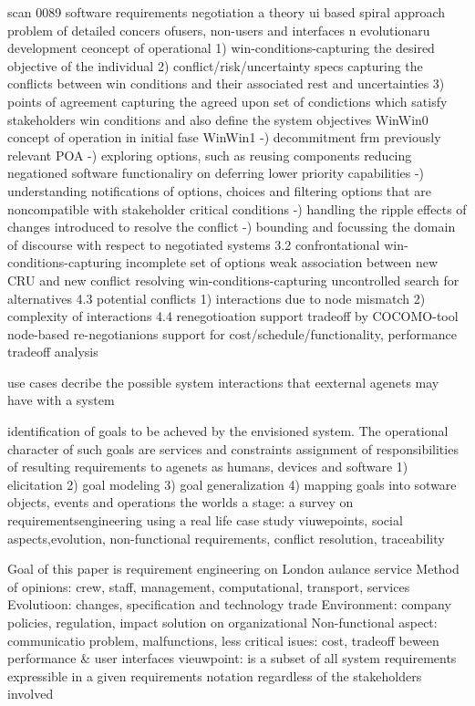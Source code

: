 scan 0089
software requirements negotiation a theory ui based spiral approach
problem of detailed concers ofusers, non-users and interfaces n evolutionaru development
ceoncept of operational
1) win-conditions-capturing the desired objective of the individual
2) conflict/risk/uncertainty specs capturing the conflicts between win conditions and their associated rest and uncertainties
3) points of agreement capturing the agreed upon set of condictions which satisfy stakeholders  win conditions and also define the system objectives
WinWin0 concept of operation in initial fase
WinWin1
-) decommitment frm previously relevant POA
-) exploring options, such as reusing components reducing negationed software functionaliry on deferring lower priority capabilities
-) understanding notifications of options, choices and filtering options that are noncompatible with stakeholder critical conditions
-) handling the ripple effects of changes introduced to resolve the conflict
-) bounding and focussing the domain of discourse with respect to negotiated systems
3.2
confrontational win-conditions-capturing
incomplete set of options
weak association between new CRU and new conflict resolving win-conditions-capturing
uncontrolled search for alternatives
4.3 potential conflicts
1) interactions due to node mismatch
2) complexity of interactions
4.4 renegotioation support
tradeoff by COCOMO-tool
node-based re-negotianions support for cost/schedule/functionality, performance tradeoff analysis

use cases decribe the possible system interactions that eexternal agenets may have with a system


identification of goals to be acheved by the envisioned system. The operational character of such goals are services and constraints assignment of responsibilities of resulting requirements to agenets as humans, devices and software
1) elicitation
2) goal modeling
3) goal generalization
4) mapping goals into sotware objects, events and operations
the worlds a stage: a survey on requirementsengineering using a real life case study
viuwepoints, social aspects,evolution, non-functional requirements, conflict resolution, traceability

Goal of this paper is requirement  engineering on London aulance service
Method of opinions: crew, staff, management, computational, transport, services
Evolutioon: changes, specification and technology trade
Environment: company policies, regulation, impact solution on organizational
Non-functional aspect: communicatio problem, malfunctions, less critical isues: cost, tradeoff beween performance \& user interfaces
vieuwpoint: is a subset of all system requirements expressible in a given requirements notation regardless of the stakeholders involved

